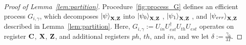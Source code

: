 
\begin{proof}[Proof of Lemma~\ref{lem:partition}]
Procedure~\ref{fig:process_G} defines an efficient process $G_{i,\gamma}$, which decomposes $\ket{\psi}_{\mathbf{X},\mathbf{Z}}$ into $\ket{\psi_0}_{\mathbf{X},\mathbf{Z}}$ , $\ket{\psi_1}_{\mathbf{X},\mathbf{Z}}$ , and $\ket{\psi_{err}}_{\mathbf{X},\mathbf{Z}}$  described in Lemma~\ref{lem:partition}.    
Here, $G_{i,\gamma} := U_{in}U^{\dag}_{est}U_{th}U_{est}$ operates on register $\mathbf{C}$, $\mathbf{X}$, $\mathbf{Z}$, and additional registers $ph$, $th$, and $in$, and we let $\delta:=\frac{\gamma_0}{3T}$.



\end{proof}

